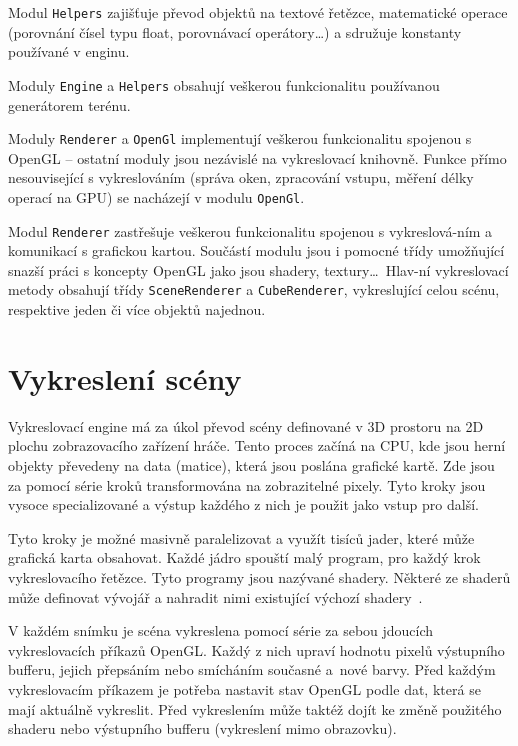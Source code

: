 \documentclass[thesis=M,czech]{FITthesis}[2019/12/23]
\begin{document}
Modul \texttt{Helpers} zajišťuje převod objektů na textové řetězce, matematické operace (porovnání čísel typu float, porovnávací operátory\dots) a sdružuje konstanty používané v enginu.

Moduly \texttt{Engine} a \texttt{Helpers} obsahují veškerou funkcionalitu používanou generátorem terénu. 

Moduly \texttt{Renderer} a \texttt{OpenGl} implementují veškerou funkcionalitu spojenou s OpenGL -- ostatní moduly jsou nezávislé na vykreslovací knihovně. Funkce přímo nesouvisející s vykreslováním (správa oken, zpracování vstupu, měření délky operací na GPU) se nacházejí v modulu \texttt{OpenGl}.

Modul \texttt{Renderer} zastřešuje veškerou funkcionalitu spojenou s vykreslová-ním a komunikací s grafickou kartou. Součástí modulu jsou i pomocné třídy umožňující snazší práci s koncepty OpenGL jako jsou shadery, textury\dots ~Hlav-ní vykreslovací metody obsahují třídy \texttt{SceneRenderer} a \texttt{CubeRenderer}, vykreslující celou scénu, respektive jeden či více objektů najednou.


\chapter{Vykreslení scény}

Vykreslovací engine má za úkol převod scény definované v 3D prostoru na 2D plochu zobrazovacího zařízení hráče. Tento proces začíná na CPU, kde jsou herní objekty převedeny na data (matice), která jsou poslána grafické kartě. Zde jsou za pomocí série kroků transformována na zobrazitelné pixely. Tyto kroky jsou vysoce specializované a výstup každého z nich je použit jako vstup pro další. 

Tyto kroky je možné masivně paralelizovat a využít tisíců jader, které může grafická karta obsahovat. Každé jádro spouští malý program, pro každý krok vykreslovacího řetězce. Tyto programy jsou nazývané shadery. Některé ze shaderů může definovat vývojář a nahradit nimi existující výchozí shadery~\cite{lopgl_triangle}.

V každém snímku je scéna vykreslena pomocí série za sebou jdoucích vykreslovacích příkazů OpenGL. Každý z nich upraví hodnotu pixelů výstupního bufferu, jejich přepsáním nebo smícháním současné a~nové barvy. Před každým vykreslovacím příkazem je potřeba nastavit stav OpenGL podle dat, která se mají aktuálně vykreslit. Před vykreslením může taktéž dojít ke změně použitého shaderu nebo výstupního bufferu (vykreslení mimo obrazovku).
\end{document}
